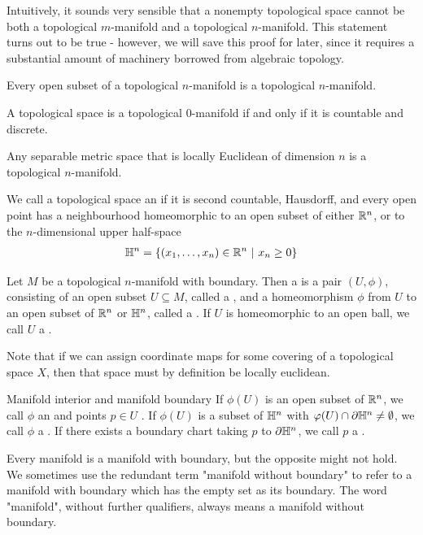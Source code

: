 Intuitively, it sounds very sensible that a nonempty topological space cannot be both a topological $m$-manifold and a topological $n$-manifold. This statement turns out to be true - however, we will save this proof for later, since it requires a substantial amount of machinery borrowed from algebraic topology.
\begin{lemma}
	Every open subset of a topological $n$-manifold is a topological $n$-manifold.
\end{lemma}
\begin{exercise}
	A topological space is a topological $0$-manifold if and only if it is countable and discrete.
\end{exercise}
\begin{theorem}
	Any separable metric space that is locally Euclidean of dimension $n$ is a topological $n$-manifold.
\end{theorem}
\begin{importantdefinition}{}{}
	We call a topological space an  if it is second countable, Hausdorff, and every open point has a neighbourhood homeomorphic to an open subset of either $\mathbb{R}^n$, or to the $n$-dimensional upper half-space
	\begin{align*}
		\mathbb{H}^n = \qty{(x_1, \hdots, x_n) \in \mathbb{R}^n ~\middle|~x_n \geq 0}
	\end{align*}
\end{importantdefinition}
\begin{importantdefinition}{}{}
	Let $M$ be a topological $n$-manifold with boundary. Then a  is a pair $(U, \phi)$, consisting of an open subset $U \subseteq M$, called a , and a homeomorphism $\phi$ from $U$ to an open subset of $\mathbb{R}^n$ or $\mathbb{H}^n$, called a . If $U$ is homeomorphic to an open ball, we call $U$ a .
	\newpar
\end{importantdefinition}
Note that if we can assign coordinate maps for some covering of a topological space $X$, then that space must by definition be locally euclidean.
\begin{importantdefinition}{Manifold interior and manifold boundary}{}
	If $\phi(U)$ is an open subset of $\mathbb{R}^n$, we call $\phi$ an  and points $p \in U$ . If $\phi(U)$ is a subset of $\mathbb{H}^n$ with $\varphi(U) \cap \partial \mathbb{H}^n \neq \emptyset$, we call $\phi$ a . If there exists a boundary chart taking $p$ to $\partial \mathbb{H}^n$, we call $p$ a .
\end{importantdefinition}
Every manifold is a manifold with boundary, but the opposite might not hold. We sometimes use the redundant term "manifold without boundary" to refer to a manifold with boundary which has the empty set as its boundary. The word "manifold", without further qualifiers, always means a manifold without boundary.

